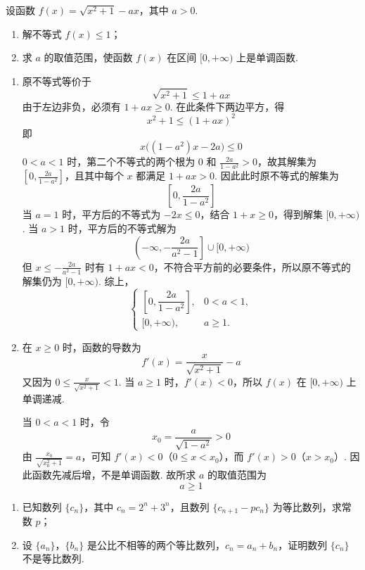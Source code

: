 \begin{problem}
设函数 \(f(x)=\sqrt{x^2+1}-ax\)，其中 \(a>0\).

\begin{enumerate}
\item 解不等式 \(f(x)\leqslant1\)；
\item 求 \(a\) 的取值范围，使函数 \(f(x)\) 在区间 \([0,+\infty)\) 上是单调函数.
\end{enumerate}
\end{problem}

\begin{solution}
\begin{enumerate}
\item 原不等式等价于
\[
\sqrt{x^2+1}\leqslant 1+ax
\]
由于左边非负，必须有 \(1+ax\geqslant0\). 在此条件下两边平方，得
\[
x^2+1\leqslant(1+ax)^2
\]
即
\[
x\bigl((1-a^2)x-2a\bigr)\leqslant0
\]
\(0<a<1\) 时，第二个不等式的两个根为 \(0\) 和 \(\frac{2a}{1-a^2}>0\)，故其解集为 \(\left[0,\frac{2a}{1-a^2}\right]\)，且其中每个 \(x\) 都满足 \(1+ax>0\). 因此此时原不等式的解集为
\[
\left[0,\frac{2a}{1-a^2}\right]
\]
当 \(a=1\) 时，平方后的不等式为 \(-2x\leqslant0\)，结合 \(1+x\geqslant0\)，得到解集 \([0,+\infty)\). 当 \(a>1\) 时，平方后的不等式解为
\[
\left(-\infty,-\frac{2a}{a^2-1}\right]\cup[0,+\infty)
\]
但 \(x\leqslant-\frac{2a}{a^2-1}\) 时有 \(1+ax<0\)，不符合平方前的必要条件，所以原不等式的解集仍为 \([0,+\infty)\). 综上，
\[
\begin{cases}
\left[0,\dfrac{2a}{1-a^2}\right],&0<a<1,\\
[0,+\infty),&a\geqslant1.
\end{cases}
\]
\item 在 \(x\geqslant0\) 时，函数的导数为
\[
f'(x)=\frac{x}{\sqrt{x^2+1}}-a
\]
又因为 \(0\leqslant\frac{x}{\sqrt{x^2+1}}<1\). 当 \(a\geqslant1\) 时，\(f'(x)<0\)，所以 \(f(x)\) 在 \([0,+\infty)\) 上单调递减.

当 \(0<a<1\) 时，令
\[
x_0=\frac{a}{\sqrt{1-a^2}}>0
\]
由 \(\frac{x_0}{\sqrt{x_0^2+1}}=a\)，可知 \(f'(x)<0\)（\(0\leqslant x<x_0\)），而 \(f'(x)>0\)（\(x>x_0\)）. 因此函数先减后增，不是单调函数. 故所求 \(a\) 的取值范围为
\[
a\geqslant1
\]
\end{enumerate}
\end{solution}

\begin{problem}
\begin{enumerate}
\item 已知数列 \(\{c_n\}\)，其中 \(c_n=2^n+3^n\)，且数列 \(\{c_{n+1}-pc_n\}\) 为等比数列，求常数 \(p\)；
\item 设 \(\{a_n\}\)，\(\{b_n\}\) 是公比不相等的两个等比数列，\(c_n=a_n+b_n\)，证明数列 \(\{c_n\}\) 不是等比数列.
\end{enumerate}
\end{problem}

